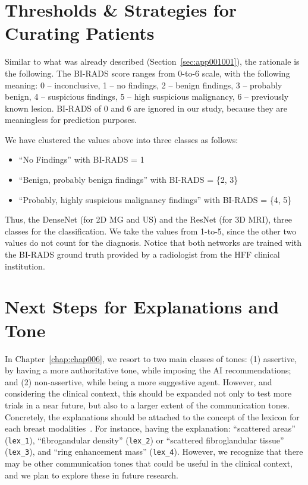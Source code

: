 \section{Thresholds \& Strategies for Curating Patients}
\label{sec:app001006}

Similar to what was already described (Section~\ref{sec:app001001}), the rationale is the following.
The \ac{BI-RADS} score ranges from 0-to-6 scale, with the following meaning:
0 -- inconclusive,
1 -- no findings,
2 -- benign findings,
3 -- probably benign,
4 -- suspicious findings,
5 -- high suspicious malignancy,
6 -- previously known lesion.
\ac{BI-RADS} of 0 and 6 are ignored in our study, because they are meaningless for prediction purposes.

\vspace{1.15mm}

\noindent
We have clustered the values above into three classes as follows:

\vspace{0.05mm}

\begin{itemize}
\item ``No Findings'' with \ac{BI-RADS} = 1
\item ``Benign, probably benign findings'' with \ac{BI-RADS} = \{2, 3\}
\item ``Probably, highly suspicious malignancy findings'' with \ac{BI-RADS} = \{4, 5\}
\end{itemize}

Thus, the  DenseNet (for 2D \ac{MG} and \ac{US}) and the ResNet (for 3D \ac{MRI}), three classes for the classification.
We take the values from 1-to-5, since the other two values do not count for the diagnosis.
Notice that both networks are trained with the \ac{BI-RADS} ground truth provided by a radiologist from the \ac{HFF} clinical institution.

\section{Next Steps for Explanations and Tone}
\label{sec:app001007}

In Chapter~\ref{chap:chap006}, we resort to two main classes of tones:
(1) assertive, by having a more authoritative tone, while imposing the \ac{AI} recommendations; and
(2) non-assertive, while being a more suggestive agent.
However, and considering the clinical context, this should be expanded not only to test more trials in a near future, but also to a larger extent of the communication tones.
Concretely, the explanations should be attached to the concept of the lexicon for each breast modalities~\cite{SPAK2017179}.
For instance, having the explanation: ``scattered areas'' (\texttt{lex\_1}), ``fibrogandular density'' (\texttt{lex\_2})  or ``scattered fibroglandular tissue'' (\texttt{lex\_3}), and ``ring enhancement mass'' (\texttt{lex\_4}).
However, we recognize that there may be other communication tones that could be useful in the clinical context, and we plan to explore these in future research.

